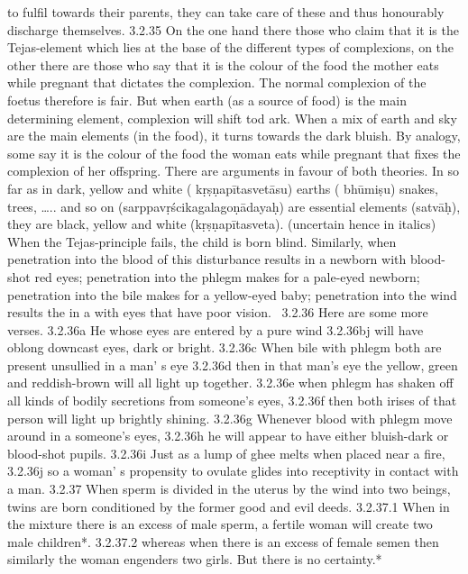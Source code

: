\begin{translation}
  to fulfil towards their parents, they can take care of these and thus honourably 
  discharge themselves.
  3.2.35 On the one hand there those who claim that it is the Tejas-element 
  which lies at the base of the different types of complexions, on the other there 
  are those who say that it is the colour of the food the mother eats while 
  pregnant that dictates the complexion. The normal complexion of the foetus 
  therefore is fair. But when earth (as a source of food) is the main determining 
  element, complexion will shift tod ark. When a mix of earth and sky are the 
  main elements (in the food), it turns towards the dark bluish. By analogy, some 
  say it is the colour of the food the woman eats while pregnant that fixes the 
  complexion of her offspring. There are arguments in favour of both theories. 
  In so far as in dark, yellow and white ( kṛṣṇapītasvetāsu)  earths ( bhūmiṣu) 
  snakes, trees, ….. and so on (sarppavṛścikagalagoṇādayaḥ) are essential 
  elements (satvāḥ), they are black, yellow and white (kṛṣṇapītasveta). (uncertain 
  hence in italics)
  When the Tejas-principle fails, the child is born blind. Similarly, when 
  penetration into the blood of this disturbance results in a newborn with 
  blood-shot red eyes; penetration into the phlegm makes for a pale-eyed 
  newborn; penetration into the bile makes for a yellow-eyed baby; penetration 
  into the wind results  the in a with eyes that have poor vision. 
  3.2.36 Here are some more verses.
  3.2.36a He whose eyes are entered by a pure wind
  3.2.36bj will have oblong downcast eyes, dark or bright.
  3.2.36c When bile with phlegm both are present unsullied in a man’ s eye 
  3.2.36d then in that man’s eye the yellow, green and reddish-brown will all light 
  up together. 
  3.2.36e when phlegm has shaken off all kinds of bodily secretions from 
  someone’s eyes,
  3.2.36f then both irises of that person will light up brightly shining. 
  3.2.36g Whenever blood with phlegm move around in a someone’s eyes,
  3.2.36h he will appear to have either bluish-dark or blood-shot pupils. 
  3.2.36i Just as a lump of ghee melts when placed near a fire,
  3.2.36j so a woman’ s propensity to ovulate glides into receptivity in contact 
  with a man.  
  3.2.37 When sperm is divided in the uterus by the wind into two beings, twins 
  are born conditioned by the former good and evil deeds.  
  3.2.37.1 When in the mixture there is an excess of male sperm, a fertile woman 
  will create two male children*.
  3.2.37.2 whereas when there is an excess of female semen then similarly the 
  woman engenders two girls. But there is no certainty.*

\end{translation}
